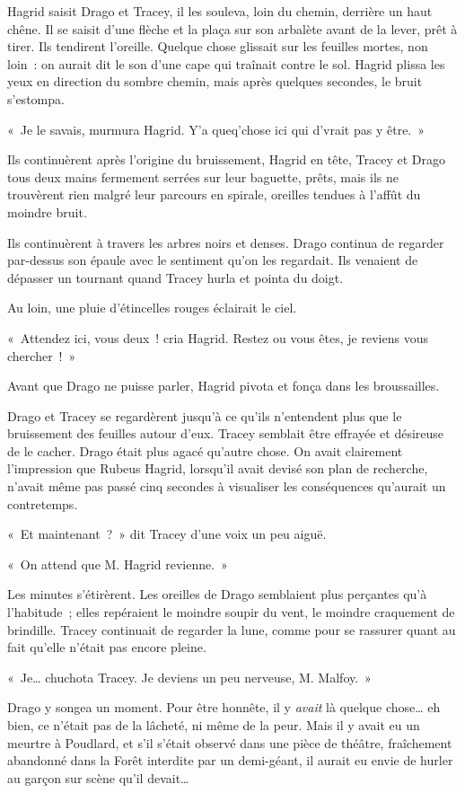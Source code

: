 Hagrid saisit Drago et Tracey, il les souleva, loin du chemin, derrière un haut chêne.
Il se saisit d'une flèche et la plaça sur son arbalète avant de la lever, prêt à tirer.
Ils tendirent l'oreille.
Quelque chose glissait sur les feuilles mortes, non loin~: on aurait dit le son d'une cape qui traînait contre le sol.
Hagrid plissa les yeux en direction du sombre chemin, mais après quelques secondes, le bruit s'estompa.

«~Je le savais, murmura Hagrid.
Y'a queq'chose ici qui d'vrait pas y être.~»

Ils continuèrent après l'origine du bruissement, Hagrid en tête, Tracey et Drago tous deux mains fermement serrées sur leur baguette, prêts, mais ils ne trouvèrent rien malgré leur parcours en spirale, oreilles tendues à l'affût du moindre bruit.

Ils continuèrent à travers les arbres noirs et denses.
Drago continua de regarder par-dessus son épaule avec le sentiment qu'on les regardait.
Ils venaient de dépasser un tournant quand Tracey hurla et pointa du doigt.

Au loin, une pluie d'étincelles rouges éclairait le ciel.

«~Attendez ici, vous deux~! cria Hagrid.
Restez ou vous êtes, je reviens vous chercher~!~»

Avant que Drago ne puisse parler, Hagrid pivota et fonça dans les broussailles.

Drago et Tracey se regardèrent jusqu'à ce qu'ils n'entendent plus que le bruissement des feuilles autour d'eux.
Tracey semblait être effrayée et désireuse de le cacher.
Drago était plus agacé qu'autre chose.
On avait clairement l'impression que Rubeus Hagrid, lorsqu'il avait devisé son plan de recherche, n'avait même pas passé cinq secondes à visualiser les conséquences qu'aurait un contretemps.

«~Et maintenant~?~»
dit Tracey d'une voix un peu aiguë.

«~On attend que M. Hagrid revienne.~»

Les minutes s'étirèrent.
Les oreilles de Drago semblaient plus perçantes qu'à l'habitude~; elles repéraient le moindre soupir du vent, le moindre craquement de brindille.
Tracey continuait de regarder la lune, comme pour se rassurer quant au fait qu'elle n'était pas encore pleine.

«~Je… chuchota Tracey.
Je deviens un peu nerveuse, M. Malfoy.~»

Drago y songea un moment.
Pour être honnête, il y \emph{avait} là quelque chose… eh bien, ce n'était pas de la lâcheté, ni même de la peur.
Mais il y avait eu un meurtre à Poudlard, et s'il s'était observé dans une pièce de théâtre, fraîchement abandonné dans la Forêt interdite par un demi-géant, il aurait eu envie de hurler au garçon sur scène qu'il devait…


